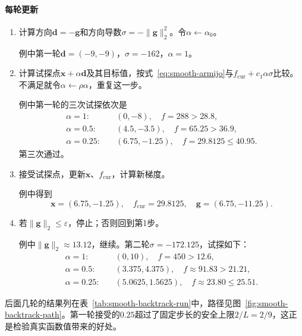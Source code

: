 \paragraph{每轮更新}
\begin{enumerate}
 \item 计算方向$\bm{d}=-\bm{g}$和方向导数$\sigma=-\lVert\bm{g}\rVert_2^2$。令$\alpha\leftarrow\alpha_0$。

 例中第一轮$\bm{d}=(-9,-9)$，$\sigma=-162$，$\alpha=1$。

 \item 计算试探点$\bm{x}+\alpha\bm{d}$及其目标值，按式~\eqref{eq:smooth-armijo}与$f_{\mathrm{cur}}+c_1\alpha\sigma$比较。不满足就令$\alpha\leftarrow\rho\alpha$，重复这一步。

 例中第一轮的三次试探依次是
 \[
 \begin{aligned}
 \alpha=1:&\quad(0,-8),\quad f=288>28.8,\\
 \alpha=0.5:&\quad(4.5,-3.5),\quad f=65.25>36.9,\\
 \alpha=0.25:&\quad(6.75,-1.25),\quad f=29.8125\leq40.95.
 \end{aligned}
 \]
 第三次通过。

 \item 接受试探点，更新$\bm{x}$、$f_{\mathrm{cur}}$，计算新梯度。

 例中得到
 \[
 \bm{x}=(6.75,-1.25),\quad f_{\mathrm{cur}}=29.8125,\quad\bm{g}=(6.75,-11.25).
 \]

 \item 若$\lVert\bm{g}\rVert_2\leq\varepsilon$，停止；否则回到第1步。

 例中$\lVert\bm{g}\rVert_2\approx13.12$，继续。第二轮$\sigma=-172.125$，试探如下：
 \[
 \begin{aligned}
 \alpha=1:&\quad(0,10),\quad f=450>12.6,\\
 \alpha=0.5:&\quad(3.375,4.375),\quad f\approx91.83>21.21,\\
 \alpha=0.25:&\quad(5.0625,1.5625),\quad f\approx23.80\leq25.51.
 \end{aligned}
 \]
\end{enumerate}

后面几轮的结果列在表~\ref{tab:smooth-backtrack-run}中，路径见图~\ref{fig:smooth-backtrack-path}。第一轮接受的$0.25$超过了固定步长的安全上限$2/L=2/9$，这正是检验真实函数值带来的好处。

